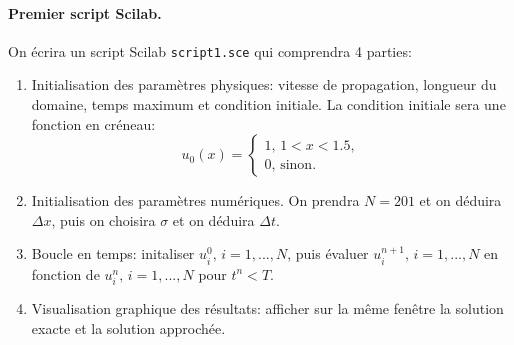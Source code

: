 \documentclass[12pt,a4paper]{article}
\begin{document}
\paragraph{Premier script Scilab.} On \'ecrira un script Scilab \texttt{script1.sce} qui comprendra 4 parties:
\begin{enumerate}
\item Initialisation des param\`etres physiques: vitesse de propagation, longueur du domaine, temps maximum et condition initiale. La condition initiale sera une fonction en cr\'eneau:
$$
u_0(x)=\left\{\begin{array}{l} 1,\,1<x<1.5,\\0,\,\mbox{sinon}.\end{array}\right.
$$
\item Initialisation des param\`etres num\'eriques. On prendra $N=201$ et on d\'eduira $\Delta x$, puis on choisira $\sigma$ et on d\'eduira $\Delta t$.
\item Boucle en temps: initaliser $u_i^0,\, i=1,...,N$, puis \'evaluer
  $u_i^{n+1},\, i=1,..., N$ en fonction de $u_i^n,\, i=1,...,N$ pour $t^n<T$.
\item Visualisation graphique des r\'esultats: afficher sur la m\^eme fen\^etre la solution exacte et la solution approch\'ee.
\end{enumerate}
\end{document}
